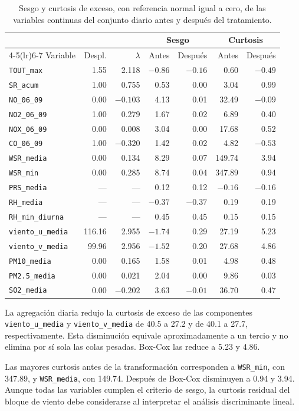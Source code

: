 \begin{table}[pos=t]
  \centering
  \caption{Sesgo y curtosis de exceso, con referencia normal igual a cero, de
    las variables continuas del conjunto diario antes y después del
    tratamiento.}
  \label{tab:dic-diario-sesgo}
  \small
  \setlength{\tabcolsep}{6pt}
  \begin{tabular}{lrrrrrr}
    \toprule
    & & & \multicolumn{2}{c}{Sesgo} & \multicolumn{2}{c}{Curtosis} \\
    \cmidrule(lr){4-5}\cmidrule(lr){6-7}
    Variable & Despl. & $\lambda$ & Antes & Después & Antes & Después \\
    \midrule
    \texttt{TOUT\_max} & 1.55 & 2.118 & $-0.86$ & $-0.16$ & 0.60 & $-0.49$ \\
    \texttt{SR\_acum} & 1.00 & 0.755 & 0.53 & 0.00 & 3.04 & 0.99 \\
    \texttt{NO\_06\_09} & 0.00 & $-0.103$ & 4.13 & 0.01 & 32.49 & $-0.09$ \\
    \texttt{NO2\_06\_09} & 1.00 & 0.279 & 1.67 & 0.02 & 6.89 & 0.40 \\
    \texttt{NOX\_06\_09} & 0.00 & 0.008 & 3.04 & 0.00 & 17.68 & 0.52 \\
    \texttt{CO\_06\_09} & 1.00 & $-0.320$ & 1.42 & 0.02 & 4.82 & $-0.53$ \\
    \texttt{WSR\_media} & 0.00 & 0.134 & 8.29 & 0.07 & 149.74 & 3.94 \\
    \texttt{WSR\_min} & 0.00 & 0.285 & 8.74 & 0.04 & 347.89 & 0.94 \\
    \texttt{PRS\_media} & --- & --- & 0.12 & 0.12 & $-0.16$ & $-0.16$ \\
    \texttt{RH\_media} & --- & --- & $-0.37$ & $-0.37$ & 0.19 & 0.19 \\
    \texttt{RH\_min\_diurna} & --- & --- & 0.45 & 0.45 & 0.15 & 0.15 \\
    \texttt{viento\_u\_media} & 116.16 & 2.955 & $-1.74$ & 0.29 & 27.19 & 5.23 \\
    \texttt{viento\_v\_media} & 99.96 & 2.956 & $-1.52$ & 0.20 & 27.68 & 4.86 \\
    \texttt{PM10\_media} & 0.00 & 0.165 & 1.58 & 0.01 & 4.98 & 0.48 \\
    \texttt{PM2.5\_media} & 0.00 & 0.021 & 2.04 & 0.00 & 9.86 & 0.03 \\
    \texttt{SO2\_media} & 0.00 & $-0.202$ & 3.63 & $-0.01$ & 36.70 & 0.47 \\
    \bottomrule
  \end{tabular}
\end{table}

La agregación diaria redujo la curtosis de exceso de las componentes
\texttt{viento\_u\_media} y \texttt{viento\_v\_media} de 40.5 a 27.2 y de 40.1
a 27.7, respectivamente. Esta disminución equivale aproximadamente a un tercio y
no elimina por sí sola las colas pesadas. Box-Cox las reduce a 5.23 y 4.86.

Las mayores curtosis antes de la transformación corresponden a
\texttt{WSR\_min}, con 347.89, y \texttt{WSR\_media}, con 149.74. Después de
Box-Cox disminuyen a 0.94 y 3.94. Aunque todas las variables cumplen el criterio
de sesgo, la curtosis residual del bloque de viento debe considerarse al
interpretar el análisis discriminante lineal.
